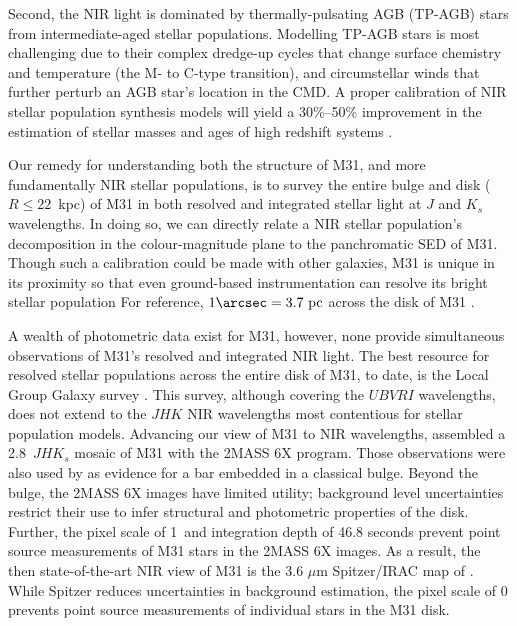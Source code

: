 \documentclass[iop]{emulateapj}
\newcommand{\eg}{\textit{e.g.,~}}
\begin{document}
Second, the NIR light is dominated by thermally-pulsating AGB (TP-AGB) stars from intermediate-aged stellar populations.
Modelling TP-AGB stars is most challenging due to their complex dredge-up cycles that change surface chemistry and temperature (the M- to C-type transition), and circumstellar winds that further perturb an AGB star's location in the CMD.
A proper calibration of NIR stellar population synthesis models \cite[\eg][Charlot \& Bruzual in prep.]{Maraston:2005} will yield a 30\%--50\% improvement in the estimation of stellar masses and ages of high redshift systems \citep[\eg][]{Maraston:2006,Bruzual:2007,Conroy:2010b,Conroy:2013}.

Our remedy for understanding both the structure of M31, and more fundamentally NIR stellar populations, is to survey the entire bulge and disk ($R \leq 22$~kpc) of M31 in both resolved and integrated stellar light at $J$ and $K_s$ wavelengths.
In doing so, we can directly relate a NIR stellar population's decomposition in the colour-magnitude plane to the panchromatic SED of M31.
Though such a calibration could be made with other galaxies, M31 is unique in its proximity so that even ground-based instrumentation can resolve its bright stellar population
For reference, $1\arcsec = 3.7~\mathrm{pc}$ across the disk of M31 \citep[we adopt $D_\mathrm{M31} = 785$~kpc,][]{McConnachie:2005}.

A wealth of photometric data exist for M31, however, none provide simultaneous observations of M31's resolved and integrated NIR light.
The best resource for resolved stellar populations across the entire disk of M31, to date, is the Local Group Galaxy survey \cite[LGGS,][]{Williams:2003,Massey:2006}.
This survey, although covering the $UBVRI$ wavelengths, does not extend to the $JHK$ NIR wavelengths most contentious for stellar population models.
Advancing our view of M31 to NIR wavelengths, \cite{Beaton:2007} assembled a 2.8\arcdeg\ $JHK_s$ mosaic of M31 with the 2MASS 6X program.
Those observations were also used by \cite{Athanassoula:2006} as evidence for a bar embedded in a classical bulge.
Beyond the bulge, the 2MASS 6X images have limited utility; background level uncertainties restrict their use to infer structural and photometric properties of the disk.
Further, the pixel scale of 1\arcsec\ and integration depth of 46.8 seconds prevent point source measurements of M31 stars in the 2MASS 6X images.
As a result, the then state-of-the-art NIR view of M31 is the 3.6 $\mu$m Spitzer/IRAC map of \cite{Barmby:2006}.
While Spitzer reduces uncertainties in background estimation, the pixel scale of 0 prevents point source measurements of individual stars in the M31 disk.
\end{document}
